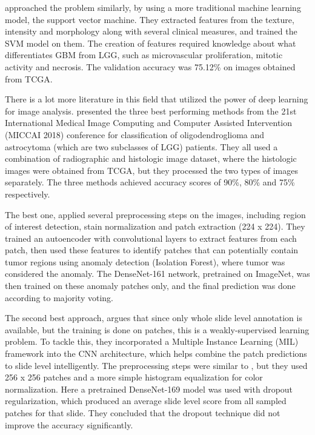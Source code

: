 \cite{cancers12030578} approached the problem similarly, by using a more traditional machine learning model, the support vector machine. They extracted features from the texture, intensity and morphology along with several clinical measures, and trained the SVM model on them. The creation of features required knowledge about what differentiates GBM from LGG, such as microvascular proliferation, mitotic activity and necrosis. The validation accuracy was 75.12\% on images obtained from TCGA.

There is a lot more literature in this field that utilized the power of deep learning for image analysis. \cite{Kurc2020} presented the three best performing methods from the 21st International Medical Image Computing and Computer Assisted Intervention (MICCAI 2018) conference for classification of oligodendroglioma and astrocytoma (which are two subclasses of LGG) patients. They all used a combination of radiographic and histologic image dataset, where the histologic images were obtained from TCGA, but they processed the two types of images separately. The three methods achieved accuracy scores of 90\%, 80\% and 75\% respectively. 

The best one, \cite{bagari2019} applied several preprocessing steps on the images, including region of interest detection, stain normalization and patch extraction (224 x 224). They trained an autoencoder with convolutional layers to extract features from each patch, then used these features to identify patches that can potentially contain tumor regions using anomaly detection (Isolation Forest), where tumor was considered the anomaly. The DenseNet-161 network, pretrained on ImageNet, was then trained on these anomaly patches only, and the final prediction was done according to majority voting. 

The second best approach, \cite{momeni2018} argues that since only whole slide level annotation is available, but the training is done on patches, this is a weakly-supervised learning problem. To tackle this, they incorporated a Multiple Instance Learning (MIL) framework into the CNN architecture, which helps combine the patch predictions to slide level intelligently. The preprocessing steps were similar to \cite{bagari2019}, but they used 256 x 256 patches and a more simple histogram equalization for color normalization. Here a pretrained DenseNet-169 model was used with dropout regularization, which produced an average slide level score from all sampled patches for that slide. They concluded that the dropout technique did not improve the accuracy significantly. 

